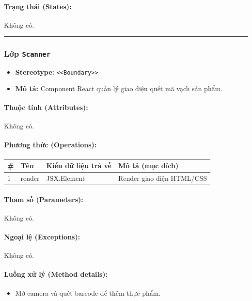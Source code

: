 \documentclass[12pt,a4paper]{article}
\begin{document}
\paragraph{Trạng thái (States):}
Không có.

\vskip 0.5cm
\noindent\rule{\textwidth}{0.5pt}
\vskip 0.5cm

\subsubsection{Lớp \texttt{Scanner}}
\begin{itemize}[leftmargin=*]
    \item \textbf{Stereotype:} \texttt{\textless{}\textless{}Boundary\textgreater{}\textgreater{}}
    \item \textbf{Mô tả:} Component React quản lý giao diện quét mã vạch sản phẩm.
\end{itemize}

\paragraph{Thuộc tính (Attributes):}
Không có.

\paragraph{Phương thức (Operations):}
\begin{longtable}{|p{0.6cm}|p{3.8cm}|p{2.6cm}|p{6.5cm}|}
\hline
\textbf{\#} & \textbf{Tên} & \textbf{Kiểu dữ liệu trả về} & \textbf{Mô tả (mục đích)} \\ \hline
\endhead
1 & render & JSX.Element & Render giao diện HTML/CSS \\ \hline
\end{longtable}

\paragraph{Tham số (Parameters):}
Không có.

\paragraph{Ngoại lệ (Exceptions):}
Không có.

\paragraph{Luồng xử lý (Method details):}
\begin{itemize}[leftmargin=*]
    \item Mở camera và quét barcode để thêm thực phẩm.
\end{itemize}
\end{document}
